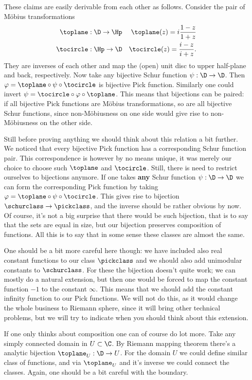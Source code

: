 These claims are easily derivable from each other as follows. Consider the pair of Möbius transformations
\begin{eqnarray*}
	\toplane : \D \to \Hp & & \toplane (z) = i \frac{1 - z}{1 + z} \\
	\tocircle : \Hp \to \D & & \tocircle (z) = \frac{i - z}{i + z}.
\end{eqnarray*}
They are inverses of each other and map the (open) unit disc to upper half-plane and back, respectively. Now take any bijective Schur function $\psi : \D \to \D$. Then $\varphi = \toplane \circ \psi \circ \tocircle$ is bijective Pick function. Similarly one could invert $\psi = \tocircle \circ \varphi \circ \toplane$. This means that bijections can be paired: if all bijective Pick functions are Möbius transformations, so are all bijective Schur functions, since non-Möbiusness on one side would give rise to non-Möbiusness on the other side.

Still before proving anything we should think about this relation a bit further. We noticed that every bijective Pick function has a corresponding Schur function pair. This correspondence is however by no means unique, it was merely our choice to choose such $\toplane$ and $\tocircle$. Still, there is need to restrict ourselves to bijections anymore. If one takes \textbf{any} Schur function $\psi : \D \to \D$ we can form the corresponding Pick function by taking $\varphi = \toplane \circ \psi \circ \tocircle$. This gives rise to bijection $\schurclass \to \pickclass$, and the inverse should be rather obvious by now. Of course, it's not a big surprise that there would be such bijection, that is to say that the sets are equal in size, but our bijection preserves composition of functions. All this is to say that in some sense these classes are almost the same.

One should be a bit more careful here though: we have included also real constant functions to our class $\pickclass$ and we should also add unimodular constants to $\schurclass$. For these the bijection doesn't quite work; we can mostly do a natural extension, but then one would be forced to map the constant function $-1$ to the constant $\infty$. This means that we should add the constant infinity function to our Pick functions. We will not do this, as it would change the whole business to Riemann sphere, since it will bring other technical problems, but we will try to indicate when you should think about this extension.

If one only thinks about composition one can of course do lot more. Take any simply connected domain in $U \subset \C$. By Riemann mapping theorem there's a analytic bijection $\toplane_{U} : \D \to U$. For the domain $U$ we could define similar class of functions, and via $\toplane_{U}$ and it's inverse we could connect the classes. Again, one should be a bit careful with the boundary.

